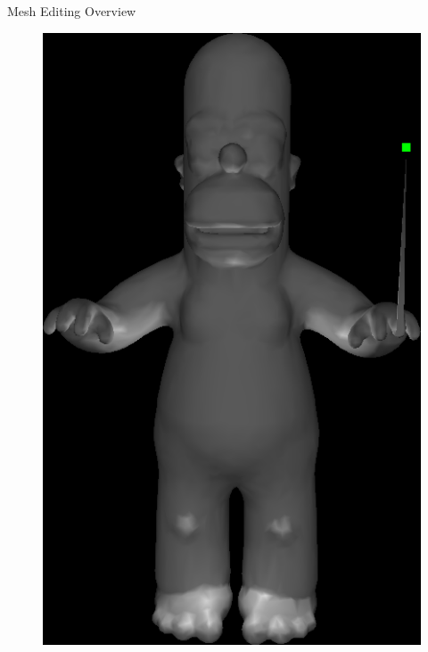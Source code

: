 \documentclass{beamer}
\begin{document}
\begin{frame}{Mesh Editing Overview}
\begin{figure}
{\begin{minipage}{0.45\textwidth}
    \includegraphics[width=\textwidth]{HomerPointDrag.png}
\end{minipage}
}
\end{figure}

\end{frame}
\end{document}
